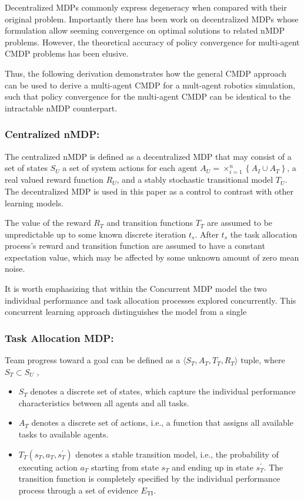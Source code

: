 \documentclass[compsoc,journal,letterpaper,10pt,draftclsnofoot,onecolumn]{IEEEtran}
\begin{document}
Decentralized MDPs commonly express degeneracy when compared with their
original problem. Importantly there has been work on decentralized MDPs
whose formulation allow seeming convergence on optimal solutions to
related nMDP problems. However, the theoretical accuracy of policy
convergence for multi-agent CMDP problems has been elusive.

Thus, the following derivation demonstrates how the general CMDP
approach can be used to derive a multi-agent CMDP for a mult-agent
robotics simulation, such that policy convergence for the multi-agent
CMDP can be identical to the intractable nMDP counterpart.

\subsubsection{Centralized nMDP:}\label{centralized-nmdp}

The centralized nMDP is defined as a decentralized MDP that may consist
of a set of states \(S_{U}\) a set of system actions for each agent
\(A_{U} = \times_{i = 1}^{n}\left\{ A_{I} \cup A_{T} \right\}\), a real
valued reward function \(R_{U}\), and a stably stochastic transitional
model \(T_{U}\). The decentralized MDP is used in this paper as a
control to contrast with other learning models.

The value of the reward \(R_{T}\) and transition functions \(T_{T}\) are
assumed to be unpredictable up to some known discrete iteration
\(t_{s}\). After \(t_{s}\) the task allocation process's reward and
transition function are assumed to have a constant expectation value,
which may be affected by some unknown amount of zero mean noise.

It is worth emphasizing that within the Concurrent MDP model the two
individual performance and task allocation processes explored
concurrently. This concurrent learning approach distinguishes the model
from a single

\subsubsection{Task Allocation MDP:}\label{task-allocation-mdp}

Team progress toward a goal can be defined as a
\( \langle S_{T}, A_{T}, T_{T}, R_{T} \rangle \) tuple, where\(S_{T} \subset S_{U}\) ,

\begin{itemize}
\item
  \(S_{T}\) denotes a discrete set of states, which capture the
  individual performance characteristics between all agents and all
  tasks.
\item
  \(A_{T}\) denotes a discrete set of actions, i.e., a function that
  assigns all available tasks to available agents.
\item
  \(T_{T}\left( s_{T}, a_{T}, s_{T}^{'} \right)\) denotes a stable
  transition model, i.e., the probability of executing action \(a_{T}\)
  starting from state \(s_{T}\) and ending up in state \(s_{T}^{'}\).
  The transition function is completely specified by the individual
  performance process through a set of evidence \(E_{\text{TI}}\).
\end{itemize}
\end{document}

